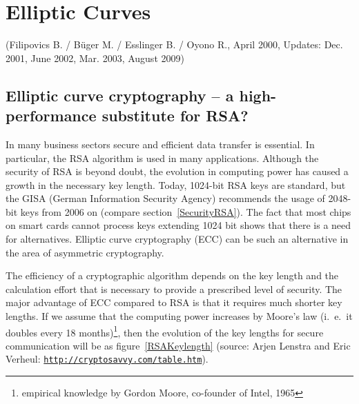 
\newpage
\hypertarget{ellcurve}{}
\chapter{Elliptic Curves}
\label{Chapter_EllipticCurves}
(Filipovics B. / B\"uger M. / Esslinger B. / Oyono R., April 2000,
Updates: Dec. 2001, June 2002, Mar. 2003, August 2009)

\section{Elliptic curve cryptography -- a high-performance substitute for RSA?}
\label{ECAlternative}


In many business sectors secure and efficient data transfer is essential.
In particular, the RSA algorithm is used in many applications. Although the
security of RSA is beyond doubt, the evolution in computing power has
caused a growth in the necessary key length.  Today, 1024-bit RSA keys are
standard, but the GISA (German Information Security Agency)
recommends the usage of 2048-bit keys from 2006 on (compare
section~\ref{SecurityRSA}).  The fact that most chips on smart cards cannot
process keys extending 1024 bit shows that there is a need for
alternatives. Elliptic curve cryptography (ECC) can be such an
alternative in the area of asymmetric cryptography.

The efficiency of a cryptographic algorithm depends on the key length and
the calculation effort that is necessary to provide a prescribed level of
security. The major advantage of ECC compared to RSA is that it requires
much shorter key lengths. If we assume that the computing power increases
by Moore's law (i.~e.\ it doubles every 18 months)\footnote{empirical
knowledge by Gordon Moore, co-founder of Intel, 1965}, then the evolution of
the key lengths for secure communication will be as figure~\ref{RSAKeylength}
\cite{ec:Lenstra1999} (source: Arjen Lenstra and Eric Verheul:
\href{http://cryptosavvy.com/table.htm}
{\texttt{http://cryptosavvy.com/table.htm}}).

